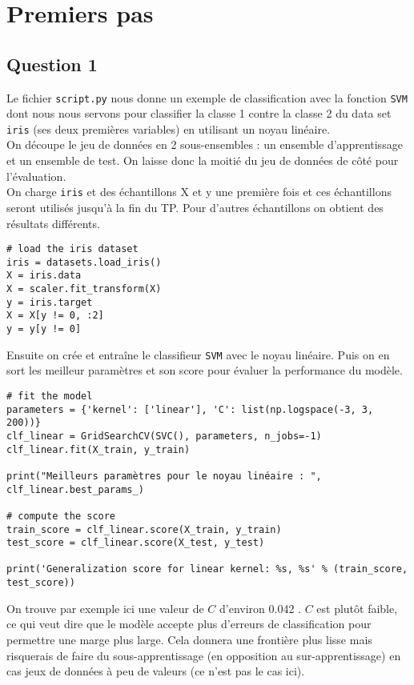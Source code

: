 \documentclass[11pt,a4paper]{article}
\begin{document}
\section*{Premiers pas}
\subsection*{Question 1}
Le fichier \texttt{script.py} nous donne un exemple de classification avec la fonction \texttt{SVM} dont nous nous servons pour classifier la classe 1 contre la classe 2 du data set \texttt{iris} (ses deux premières variables) en utilisant un noyau linéaire.\\
On découpe le jeu de données en 2 sous-ensembles : un ensemble d'apprentissage et un ensemble de test. On laisse donc la moitié du jeu de données de côté pour l'évaluation.\\
On charge \texttt{iris} et des échantillons X et y une première fois et ces échantillons seront utilisés jusqu'à la fin du TP. Pour d'autres échantillons on obtient des résultats différents.
\begin{verbatim}
# load the iris dataset
iris = datasets.load_iris()
X = iris.data
X = scaler.fit_transform(X)
y = iris.target
X = X[y != 0, :2]
y = y[y != 0]
\end{verbatim}
Ensuite on crée et entraîne le classifieur \texttt{SVM} avec le noyau linéaire. Puis on en sort les meilleur paramètres et son score pour évaluer la performance du modèle.
\begin{verbatim}
# fit the model
parameters = {'kernel': ['linear'], 'C': list(np.logspace(-3, 3, 200))}
clf_linear = GridSearchCV(SVC(), parameters, n_jobs=-1)
clf_linear.fit(X_train, y_train)

print("Meilleurs paramètres pour le noyau linéaire : ", clf_linear.best_params_)

# compute the score
train_score = clf_linear.score(X_train, y_train)
test_score = clf_linear.score(X_test, y_test)

print('Generalization score for linear kernel: %s, %s' % (train_score, test_score))
\end{verbatim}
On trouve par exemple ici une valeur de $C$ d'environ 0.042 . $C$ est plutôt faible, ce qui veut dire que le modèle accepte plus d'erreurs de classification pour permettre une marge plus large. Cela donnera une frontière plus lisse mais risquerais de faire du sous-apprentissage (en opposition au sur-apprentissage) en cas jeux de données à peu de valeurs (ce n'est pas le cas ici).\\
\end{document}
